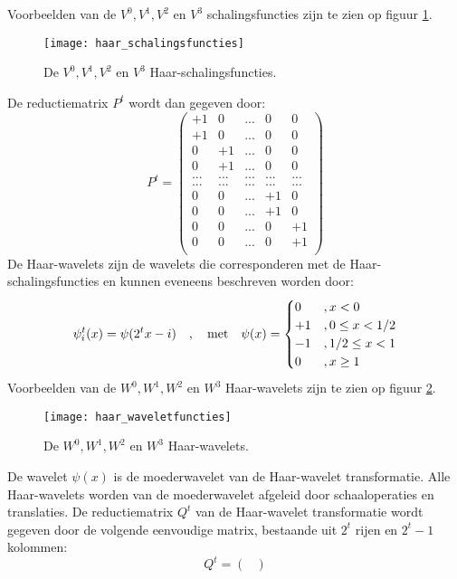 \begin{enumerate}
{\begin{itemize}
		Voorbeelden van de $V^0, V^1, V^2$ en $V^3$ schalingsfuncties zijn te zien op figuur \ref{fig:haar_schalingsfuncties}.
		\begin{figure}[ht]
			\centering
			\texttt{[image: haar\_schalingsfuncties]}
			\caption{De $V^0, V^1, V^2$ en $V^3$ Haar-schalingsfuncties.}
			\label{fig:haar_schalingsfuncties}
		\end{figure}
		De reductiematrix $P^t$ wordt dan gegeven door:
		$$
		P^t = 
		\begin{pmatrix}
			+1 & 0 & ... & 0 & 0 \\
			+1 & 0 & ... & 0 & 0 \\
			0 & +1 &  ... & 0 & 0 \\
			0 & +1 &  ... & 0 & 0 \\
			... & ... & ... & ... & ... \\
			... & ... & ... & ... & ... \\
		 	0 & 0 & ... & +1 & 0  \\
		 	0 & 0 & ... & +1 & 0  \\
		 	0 & 0 & ... & 0 & +1  \\
		 	0 & 0 & ... & 0 & +1  \\
		\end{pmatrix}
		$$
		De Haar-wavelets zijn de wavelets die corresponderen met de Haar-schalingsfuncties en kunnen eveneens beschreven worden door:
		$$\psi_i^t(x) = \psi(2^tx - i)\quad,\quad\hbox{met}\quad \psi(x) = \begin{cases}
			0 &, x < 0 \\
			+ 1 &, 0 \leq x < 1/2 \\
			-1 &, 1/2 \leq x < 1 \\
			0 &, x \geq 1
		\end{cases}$$
		Voorbeelden van de $W^0, W^1, W^2$ en $W^3$ Haar-wavelets zijn te zien op figuur \ref{fig:haar_waveletfuncties}.
		\begin{figure}[ht]
			\centering
			\texttt{[image: haar\_waveletfuncties]}
			\caption{De $W^0, W^1, W^2$ en $W^3$ Haar-wavelets.}
			\label{fig:haar_waveletfuncties}
		\end{figure}
		De wavelet $\psi(x)$ is de moederwavelet van de Haar-wavelet transformatie. Alle Haar-wavelets worden van de moederwavelet afgeleid door schaaloperaties en translaties. De reductiematrix $Q^t$ van de Haar-wavelet transformatie wordt gegeven door de volgende eenvoudige matrix, bestaande uit $2^t$ rijen en $2^t - 1$ kolommen:
		$$
		Q^t =
		\begin{pmatrix}

\end{pmatrix}$$
\end{itemize}}
\end{enumerate}
